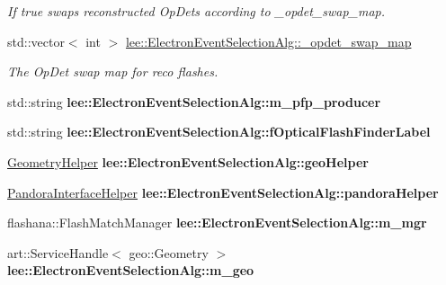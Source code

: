 \begin{DoxyCompactItemize}
\begin{DoxyCompactList}\small\item\em If true swaps reconstructed Op\-Dets according to \-\_\-opdet\-\_\-swap\-\_\-map. \end{DoxyCompactList}\item 
\hypertarget{group__lee_ga3b8e7b46ec5b2db6008972662b2feb7f}{std\-::vector$<$ int $>$ \hyperlink{group__lee_ga3b8e7b46ec5b2db6008972662b2feb7f}{lee\-::\-Electron\-Event\-Selection\-Alg\-::\-\_\-opdet\-\_\-swap\-\_\-map}}\label{group__lee_ga3b8e7b46ec5b2db6008972662b2feb7f}

\begin{DoxyCompactList}\small\item\em The Op\-Det swap map for reco flashes. \end{DoxyCompactList}\item 
\hypertarget{group__lee_ga22dc43acead400d57a885ef5f4eadfe0}{std\-::string {\bfseries lee\-::\-Electron\-Event\-Selection\-Alg\-::m\-\_\-pfp\-\_\-producer}}\label{group__lee_ga22dc43acead400d57a885ef5f4eadfe0}

\item 
\hypertarget{group__lee_gaab3778b534309c11083d606aad56191b}{std\-::string {\bfseries lee\-::\-Electron\-Event\-Selection\-Alg\-::f\-Optical\-Flash\-Finder\-Label}}\label{group__lee_gaab3778b534309c11083d606aad56191b}

\item 
\hypertarget{group__lee_ga99a124186e74bce53dd84068083cc90d}{\hyperlink{classGeometryHelper}{Geometry\-Helper} {\bfseries lee\-::\-Electron\-Event\-Selection\-Alg\-::geo\-Helper}}\label{group__lee_ga99a124186e74bce53dd84068083cc90d}

\item 
\hypertarget{group__lee_gab6b3531c56323d02225e257a191d7a65}{\hyperlink{classPandoraInterfaceHelper}{Pandora\-Interface\-Helper} {\bfseries lee\-::\-Electron\-Event\-Selection\-Alg\-::pandora\-Helper}}\label{group__lee_gab6b3531c56323d02225e257a191d7a65}

\item 
\hypertarget{group__lee_ga49fb9654c5609485ae6745fdbb84335c}{flashana\-::\-Flash\-Match\-Manager {\bfseries lee\-::\-Electron\-Event\-Selection\-Alg\-::m\-\_\-mgr}}\label{group__lee_ga49fb9654c5609485ae6745fdbb84335c}

\item 
\hypertarget{group__lee_ga6d19e99bac2aebf0710321e4b9d2d394}{art\-::\-Service\-Handle$<$ geo\-::\-Geometry $>$ {\bfseries lee\-::\-Electron\-Event\-Selection\-Alg\-::m\-\_\-geo}}\label{group__lee_ga6d19e99bac2aebf0710321e4b9d2d394}


\end{DoxyCompactItemize}
